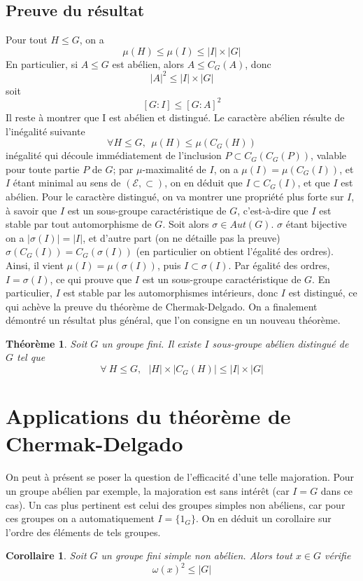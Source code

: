 \documentclass[10pt,a4paper]{article}
\newtheorem{theorem}{Théorème}
\newtheorem{cor}{Corollaire}
\begin{document}
\subsection{Preuve du résultat}
Pour tout $H \leq G$, on a 
$$\mu (H) \leq \mu (I) \leq |I|\times |G|$$
En particulier, si $A \leq G$ est abélien, alors $A \leq C_{G}(A)$, donc 
$$|A|^{2} \leq |I|\times |G|$$ 
soit
$$ [G:I] \leq [G:A]^{2}$$
Il reste à montrer que I est abélien et distingué. Le caractère abélien résulte de l'inégalité suivante 
$$ \forall H \leq G , \:\: \mu (H) \leq \mu (C_{G}(H))$$
inégalité qui découle immédiatement de l'inclusion $P \subset C_{G}(C_{G}(P))$, valable pour toute partie $P$ de $G$; par $\mu$-maximalité de $I$, on a $\mu(I)=\mu(C_{G}(I))$, et $I$ étant minimal au sens de $(\mathcal{E} , \subset )$, on en déduit que $I \subset C_{G}(I)$, et que $I$ est abélien.
\newline
Pour le caractère distingué, on va montrer une propriété plus forte sur $I$, à savoir que $I$ est un sous-groupe caractéristique de $G$, c'est-à-dire que $I$ est stable par tout automorphisme de $G$. Soit alors $\sigma \in Aut(G)$. $\sigma$ étant bijective on a $|\sigma (I) | = |I|$, et d'autre part (on ne détaille pas la preuve) $\sigma (C_{G}(I))=C_{G}(\sigma(I))$ (en particulier on obtient l'égalité des ordres). Ainsi, il vient $\mu(I)=\mu(\sigma(I))$, puis $I \subset \sigma(I)$. Par égalité des ordres, $I=\sigma (I)$, ce qui prouve que $I$ est un sous-groupe caractéristique de $G$. En particulier, $I$ est stable par les automorphismes intérieurs, donc $I$ est distingué, ce qui achève la preuve du théorème de Chermak-Delgado. 
\newline  
On a finalement démontré un résultat plus général, que l'on consigne en un nouveau théorème.
\begin{theorem}
Soit $G$ un groupe fini. Il existe $I$ sous-groupe abélien distingué de $G$ tel que
$$\forall \: H \leq G, \:\:\: |H| \times |C_{G}(H)| \leq |I| \times |G|$$ 
\end{theorem}
\section{Applications du théorème de Chermak-Delgado}
On peut à présent se poser la question de l'efficacité d'une telle majoration. Pour un groupe abélien par exemple, la majoration est sans intérêt (car $I=G$ dans ce cas). Un cas plus pertinent est celui des groupes simples non abéliens, car pour ces groupes on a automatiquement $I=\{1_{G}\}$. On en déduit un corollaire sur l'ordre des éléments de tels groupes.
\begin{cor}
Soit $G$ un groupe fini simple non abélien. Alors tout $x \in G$ vérifie $$\omega (x) ^{2} \leq |G|$$
\end{cor}
\end{document}
